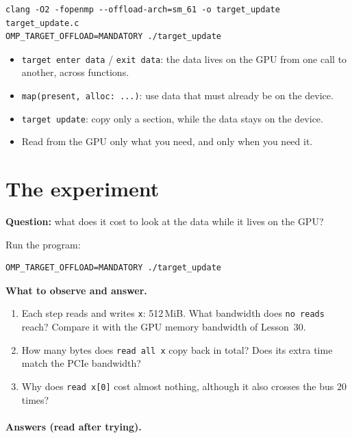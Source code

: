 \documentclass[11pt,a4paper]{article}
\let\origtexttt\texttt
\renewcommand{\texttt}[1]{\textcolor{black!60}{\origtexttt{#1}}}
\begin{document}
\begin{lstlisting}[style=sh]
clang -O2 -fopenmp --offload-arch=sm_61 -o target_update target_update.c
OMP_TARGET_OFFLOAD=MANDATORY ./target_update
\end{lstlisting}

\begin{keyidea}
\begin{itemize}
  \item \texttt{target enter data} / \texttt{exit data}: the data lives on the GPU from one
        call to another, across functions.
  \item \texttt{map(present, alloc: ...)}: use data that must already be on the device.
  \item \texttt{target update}: copy only a section, while the data stays on the device.
  \item Read from the GPU only what you need, and only when you need it.
\end{itemize}
\end{keyidea}

\section{The experiment}
\begin{experiment}
\textbf{Question:} what does it cost to look at the data while it lives on the GPU?

Run the program:
\begin{lstlisting}[style=sh]
OMP_TARGET_OFFLOAD=MANDATORY ./target_update
\end{lstlisting}

\textbf{What to observe and answer.}
\begin{enumerate}
  \item Each step reads and writes \texttt{x}: 512\,MiB. What bandwidth does \texttt{no reads}
        reach? Compare it with the GPU memory bandwidth of Lesson~30.
  \item How many bytes does \texttt{read all x} copy back in total? Does its extra time match the
        PCIe bandwidth?
  \item Why does \texttt{read x[0]} cost almost nothing, although it also crosses the bus 20
        times?
\end{enumerate}
\end{experiment}

\paragraph{Answers (read after trying).}
\end{document}

